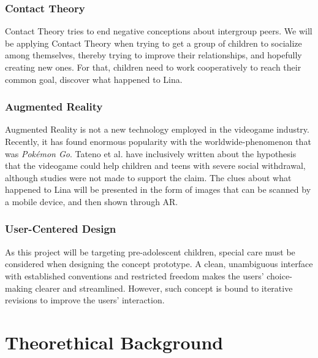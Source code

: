 \documentclass[runningheads]{llncs}
\begin{document}
\subsubsection{Contact Theory}
\par Contact Theory tries to end negative conceptions about intergroup peers. We will be applying Contact Theory when trying to get a group of children to socialize among themselves, thereby trying to improve their relationships, and hopefully creating new ones. For that, children need to work cooperatively to reach their common goal, discover what happened to Lina.

\subsubsection{Augmented Reality}
\par Augmented Reality is not a new technology employed in the videogame industry. Recently, it has found enormous popularity with the worldwide-phenomenon that was \textit{Pokémon Go}. Tateno et al. have inclusively written about the hypothesis that the videogame could help children and teens with severe social withdrawal, although studies were not made to support the claim. The clues about what happened to Lina will be presented in the form of images that can be scanned by a mobile device, and then shown through AR.  

\subsubsection{User-Centered Design}
\par As this project will be targeting pre-adolescent children, special care must be considered when designing the concept prototype. A clean, unambiguous interface with established conventions and restricted freedom makes the users' choice-making clearer and streamlined. However, such concept is bound to iterative revisions to improve the users' interaction.



\section{Theorethical Background}
\end{document}
